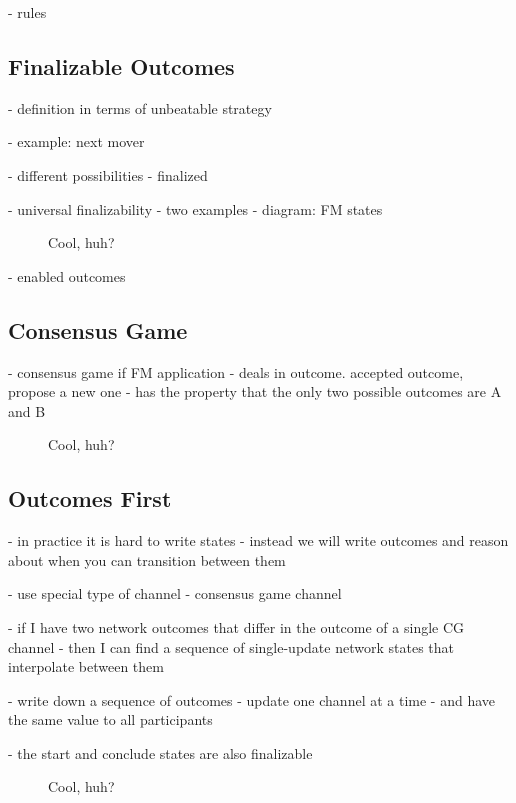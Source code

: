 - rules

\subsection{Finalizable Outcomes}

- definition in terms of unbeatable strategy

- example: next mover

- different possibilities
  - finalized

- universal finalizability
- two examples
- diagram: FM states
\begin{figure}[h]\centering
  \makebox[\textwidth][c]{}
  \caption{Cool, huh?}
\end{figure}

- enabled outcomes

\subsection{Consensus Game}

- consensus game if FM application
- deals in outcome. accepted outcome, propose a new one
- has the property that the only two possible outcomes are A and B
\begin{figure}[h]\centering
  \makebox[\textwidth][c]{}
  \caption{Cool, huh?}
\end{figure}

\subsection{Outcomes First}

- in practice it is hard to write states
- instead we will write outcomes and reason about when you can transition between them

- use special type of channel - consensus game channel


- if I have two network outcomes that differ in the outcome of a single CG channel
- then I can find a sequence of single-update network states that interpolate between them

- write down a sequence of outcomes
- update one channel at a time
- and have the same value to all participants

- the start and conclude states are also finalizable

\begin{figure}[h]\centering
  \makebox[\textwidth][c]{}
  \caption{Cool, huh?}
\end{figure}
